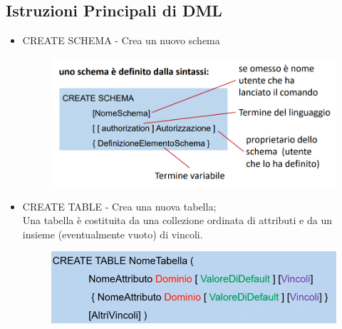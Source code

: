 \documentclass[12pt, a4paper]{article}
\begin{document}
    \subsection*{Istruzioni Principali di DML}
    \begin{itemize}
        \item CREATE SCHEMA - Crea un nuovo schema
        \begin{figure}[htbp]
            \centering
            \includegraphics[scale=0.5]{createschema.png}
        \end{figure}
        \item CREATE TABLE - Crea una nuova tabella;
        \\Una tabella è costituita da una collezione ordinata di attributi e da
        un insieme (eventualmente vuoto) di vincoli.
        \begin{figure}[htbp]
            \centering
            \includegraphics[scale=0.5]{createtable.png}
        \end{figure}
    \end{itemize}
\end{document}
